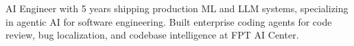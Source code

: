 
AI Engineer with 5 years shipping production ML and LLM systems, specializing in agentic AI for software engineering. Built enterprise coding agents for code review, bug localization, and codebase intelligence at FPT AI Center.
